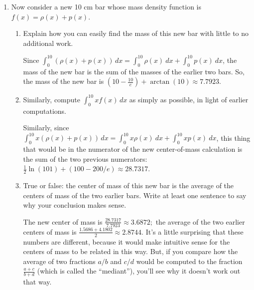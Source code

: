 \documentclass[10pt]{article}
\newenvironment{red}{\color{red}}{\ignorespacesafterend}
\begin{document}
\begin{enumerate}[leftmargin=0pt]
\begin{enumerate}
\begin{red}
    The center of mass of bar $p$ is
    \begin{align*}
        \frac{\int_0^{10}x\cdot e^{-0.1x}\, dx}{\int_0^{10} e^{-0.1x}\, dx} &= \frac{1}{10-10/e}\int_0^{10} x e^{-0.1x}\, dx \quad \text{(integration by parts)} \\
        &= \frac{1}{10-10/e}\left[-10xe^{-0.1x} - 100e^{-0.1x}\right|_0^{10} \\
        &= \frac{1}{10-10/e}
            [(-10\cdot 10 \cdot e^{-1} - 
            100\cdot e^{-1})-
            (-10\cdot 0 \cdot e^0 - 100e^0)] \\
        &= \frac{1}{10-10/e}\left[\frac{-100}{e} - \frac{100}{e} + 0 + 100\right] 
        = \frac{100 - 200/e}{10 - 10/e} \approx 4.1802
    \end{align*}
    \end{red}
    \item Now consider a new 10 cm bar whose mass density function is $f(x) = \rho(x) + p(x)$.
    \begin{enumerate}
        \item Explain how you can easily find the mass of this new bar with little to no additional work.
        
        \begin{red}
        Since $\int_0^{10} (\rho(x) + p(x))\, dx = \int_0^{10} \rho(x)\ dx + \int_0^{10}p(x)\ dx$, the mass of the new bar is the sum of the masses of the earlier two bars. So, the mass of the new bar is $ \left(10 - \frac{10}{e}\right) + \arctan(10) \approx 7.7923.$
        \end{red}
        \item Similarly, compute $\int_0^{10} x f(x)\, dx$ as simply as possible, in light of earlier computations.
        
        \begin{red}
        Similarly, since $\int_0^{10} x(\rho(x) + p(x))\, dx = \int_0^{10} x\rho(x)\ dx + \int_0^{10} x p(x)\ dx$, this thing that would be in the numerator of the new center-of-mass calculation is the sum of the two previous numerators: \\
        $\tfrac{1}{2} \ln(101) + (100 - 200/e) \approx 28.7317.$
        \end{red}
        \item True or false: the center of mass of this new bar is the average of the centers of mass of the two earlier bars. Write at least one sentence to say why your conclusion makes sense.
        
        \begin{red}
        The new center of mass is $\frac{28.7317}{ 7.7923} \approx 3.6872;$ the average of the two earlier centers of mass is $\frac{1.5686 + 4.1802}{2} \approx 2.8744.$ It's a little surprising that these numbers are different, because it would make intuitive sense for the centers of mass to be related in this way. But, if you compare how the average of two fractions $a/b$ and $c/d$ would be computed to the fraction $\frac{a+c}{b+d}$ (which is called the ``mediant''), you'll see why it doesn't work out that way.
        

\end{red}
\end{enumerate}
\end{enumerate}
\end{enumerate}
\end{document}
